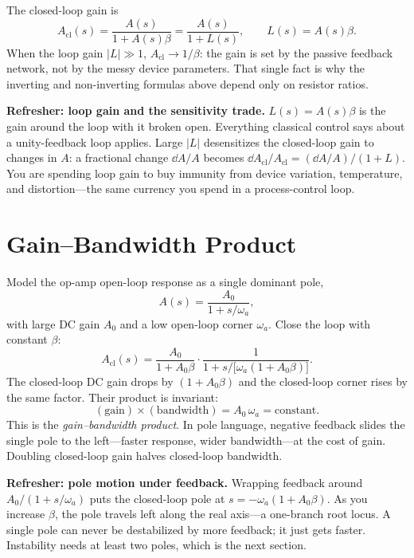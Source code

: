 The closed-loop gain is
\[
A_{\text{cl}}(s)=\frac{A(s)}{1+A(s)\beta}
=\frac{A(s)}{1+L(s)},
\qquad
L(s)=A(s)\beta .
\]
When the loop gain \(|L|\gg1\), \(A_{\text{cl}}\to 1/\beta\): the gain is set by
the passive feedback network, not by the messy device parameters. That single
fact is why the inverting and non-inverting formulas above depend only on
resistor ratios.

\begin{controlsbox}
\textbf{Refresher: loop gain and the sensitivity trade.} \(L(s)=A(s)\beta\) is the
gain around the loop with it broken open. Everything classical control says about
a unity-feedback loop applies. Large \(|L|\) desensitizes the closed-loop gain to
changes in \(A\): a fractional change \(\dd A/A\) becomes \(\dd A_{\text{cl}}/
A_{\text{cl}}=(\dd A/A)/(1+L)\). You are spending loop gain to buy immunity from
device variation, temperature, and distortion---the same currency you spend in a
process-control loop.
\end{controlsbox}

\section{Gain--Bandwidth Product}
Model the op-amp open-loop response as a single dominant pole,
\[
A(s)=\frac{A_0}{1+s/\omega_a},
\]
with large DC gain \(A_0\) and a low open-loop corner \(\omega_a\). Close the loop
with constant \(\beta\):
\[
A_{\text{cl}}(s)=\frac{A_0}{1+A_0\beta}\cdot
\frac{1}{1+s/\bigl[\omega_a(1+A_0\beta)\bigr]}.
\]
The closed-loop DC gain drops by \((1+A_0\beta)\) and the closed-loop corner rises
by the same factor. Their product is invariant:
\[
(\text{gain})\times(\text{bandwidth})=A_0\,\omega_a=\text{constant}.
\]
This is the \emph{gain--bandwidth product}. In pole language, negative feedback
slides the single pole to the left---faster response, wider bandwidth---at the
cost of gain. Doubling closed-loop gain halves closed-loop bandwidth.

\begin{controlsbox}
\textbf{Refresher: pole motion under feedback.} Wrapping feedback around
\(A_0/(1+s/\omega_a)\) puts the closed-loop pole at
\(s=-\omega_a(1+A_0\beta)\). As you increase \(\beta\), the pole travels left
along the real axis---a one-branch root locus. A single pole can never be
destabilized by more feedback; it just gets faster. Instability needs at least
two poles, which is the next section.
\end{controlsbox}

